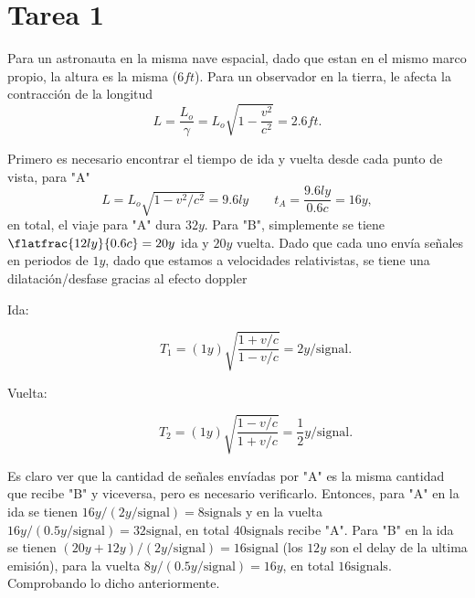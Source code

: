 \section*{Tarea 1}
\begin{mdframed}[style=warning]
	\begin{ejercicio}
		Para un astronauta en la misma nave espacial, dado que estan en el mismo marco propio, la altura es la misma ($6ft$). Para un observador en la tierra, le afecta la contracción de la longitud
			$$ L = \frac{L_o}{\gamma} = L_o \sqrt{1- \frac{v^2}{c^2}} = 2.6ft. $$
	\end{ejercicio}
\end{mdframed}


\begin{mdframed}[style=warning]
	\begin{ejercicio}
		Primero es necesario encontrar el tiempo de ida y vuelta desde cada punto de vista, para "A"
			$$ L = L_o \sqrt{1 - v^2 /c^2} = 9.6ly \qquad t_A = \frac{9.6ly}{0.6c} = 16y, $$
		en total, el viaje para "A" dura $32y$. Para "B", simplemente se tiene $\flatfrac{12ly}{0.6c} = 20y$ ida y $20y$ vuelta. Dado que cada uno envía señales en periodos de $1y$, dado que estamos a velocidades relativistas, se tiene una dilatación/desfase gracias al efecto doppler
		\begin{description}
			\item[Ida: ] $$ T_1 = (1y) \sqrt{\frac{1 + v/c}{1 - v/c}} = 2y/\text{signal}. $$
			\item[Vuelta: ] $$ T_2 = (1y) \sqrt{\frac{1 - v/c}{1 + v/c}} = \frac{1}{2} y/\text{signal}. $$
		\end{description}
		Es claro ver que la cantidad de señales envíadas por "A" es la misma cantidad que recibe "B" y viceversa, pero es necesario verificarlo. Entonces, para "A" en la ida se tienen $16y/(2y/\text{signal}) = 8\text{signals}$ y en la vuelta $16y/(0.5y/\text{signal}) = 32 \text{signal}$, en total $40\text{signals}$ recibe "A". Para "B" en la ida se tienen $(20y+12y)/(2y/\text{signal}) = 16\text{signal}$ (los $12y$ son el delay de la ultima emisión), para la vuelta $8y/(0.5y/\text{signal}) = 16y$, en total $16\text{signals}$. Comprobando lo dicho anteriormente.
	\end{ejercicio}
\end{mdframed}
